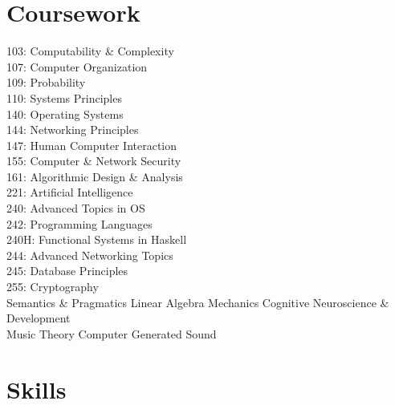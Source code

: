 \documentclass[letterpaper]{deedy-resume} %
\begin{document}
\begin{minipage}[t]{0.33\textwidth}
\section{Coursework}


103: Computability \& Complexity \\
107: Computer Organization \\
109: Probability \\
110: Systems Principles \\
140: Operating Systems \\
144: Networking Principles \\
147: Human Computer Interaction \\
155: Computer \& Network Security \\
161: Algorithmic Design \& Analysis\\
221: Artificial Intelligence \\
240: Advanced Topics in OS \\
242: Programming Languages \\
240H: Functional Systems in Haskell\\
244: Advanced Networking Topics \\
245: Database Principles \\
255: Cryptography \\
\vspace{\topsep} %
Semantics \& Pragmatics \textbullet{} Linear Algebra \textbullet{} Mechanics \textbullet{} Cognitive Neuroscience \& Development \\
Music Theory \textbullet{} Computer Generated Sound \\


\sectionspace %


\section{Skills}


\end{minipage}
\end{document}
